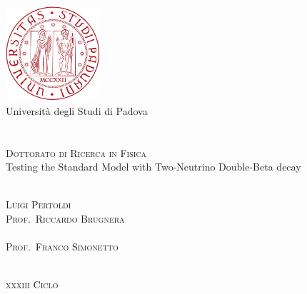 
\begin{titlepage}
  \thispagestyle{empty}
  \begin{center}
  \includegraphics[width=3.5cm]{img/unipd-logo.pdf} \\
  \vspace{0.5cm}
  {\Large Universit\`a degli Studi di Padova} \\
  \hrulefill \\
   \\
  \vspace{2cm}
  \textsc{\large Dottorato di Ricerca in Fisica} \\
  \vspace{3cm}
  \Huge{%
    Testing the Standard Model with Two-Neutrino Double-Beta decay
  }
  \end{center}
  \vspace{3cm}
  \begin{multicols}{2}
  \large
  \noindent
   \\
  \textsc{Luigi Pertoldi}
  \columnbreak
  \flushright
   \\
  \textsc{Prof.~Riccardo Brugnera} \\
  \vspace{12mm}
   \\
  \textsc{Prof.~Franco Simonetto}
  \end{multicols}
  \vspace*{\fill}
  \begin{center}
  \hrulefill \\
  \textsc{\textsc{xxxiii} Ciclo}
  \end{center}
\end{titlepage}
\restoregeometry
